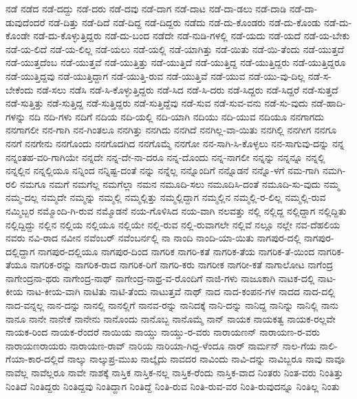 {ನಡೆ
ನಡೆದ
ನಡೆ-ದದ್ದು
ನಡೆ-ದರು
ನಡೆ-ದವು
ನಡೆ-ದಾಗ
ನಡೆ-ದಾಟ
ನಡೆ-ದಾ-ಡಲು
ನಡೆ-ದಾಡಿ
ನಡೆ-ದಾ-ಡುವುದೆಂದರೆ
ನಡೆ-ದಿತ್ತು
ನಡೆ-ದಿದೆ
ನಡೆ-ದಿದ್ದ
ನಡೆ-ದಿದ್ದರು
ನಡೆದು
ನಡೆ-ದು-ಕೊಂಡರು
ನಡೆ-ದು-ಕೊಂಡು
ನಡೆ-ದು-ಕೊಂಡೇ
ನಡೆ-ದು-ಕೊಳ್ಳುತ್ತಿದ್ದರು
ನಡೆ-ದು-ಬಂದ
ನಡೆದೇ
ನಡೆ-ನುಡಿ-ಗಳಲ್ಲಿ
ನಡೆ-ಯದು
ನಡೆ-ಯದೆ
ನಡೆ-ಯ-ಬೇಕು
ನಡೆ-ಯ-ಲಿದೆ
ನಡೆ-ಯ-ಲಿಲ್ಲ
ನಡೆ-ಯಲು
ನಡೆ-ಯಲ್ಲಿ
ನಡೆ-ಯಾಗಿತ್ತು
ನಡೆ-ಯಿತು
ನಡೆ-ಯಿ-ತೆಂದು
ನಡೆ-ಯುತ್ತದೆ
ನಡೆ-ಯುತ್ತದೆಂಬ
ನಡೆ-ಯುತ್ತವೆ
ನಡೆ-ಯುತ್ತಿತ್ತು
ನಡೆ-ಯುತ್ತಿದೆ
ನಡೆ-ಯುತ್ತಿದ್ದ
ನಡೆ-ಯುತ್ತಿದ್ದರು
ನಡೆ-ಯುತ್ತಿದ್ದರೂ
ನಡೆ-ಯುತ್ತಿದ್ದವು
ನಡೆ-ಯುತ್ತಿದ್ದಾಗ
ನಡೆ-ಯುತ್ತಿ-ರುವ
ನಡೆ-ಯುತ್ತಿವೆ
ನಡೆ-ಯುವ
ನಡೆ-ಯು-ವು-ದಿಲ್ಲ
ನಡೆ-ಸ-ಬೇಕೆಂದು
ನಡೆ-ಸಲು
ನಡೆಸಿ
ನಡೆ-ಸಿ-ಕೊಳ್ಳುತ್ತಿದ್ದರು
ನಡೆ-ಸಿದ
ನಡೆ-ಸಿ-ದರು
ನಡೆ-ಸಿದ್ದರು
ನಡೆ-ಸಿದ್ದರೆ
ನಡೆ-ಸುತ್ತದೆ
ನಡೆ-ಸುತ್ತಿತ್ತು
ನಡೆ-ಸುತ್ತಿದ್ದ
ನಡೆ-ಸುತ್ತಿದ್ದರು
ನಡೆ-ಸುತ್ತಿದ್ದೆವು
ನಡೆ-ಸುವ
ನಡೆ-ಸುವ-ವನು
ನಡೆ-ಸು-ವುದು
ನಡೆ-ಹಾದಿ-ಗಳನ್ನು
ನದಿ
ನದಿ-ಗಳು
ನದಿಗೆ
ನದಿಯ
ನದಿ-ಯಲ್ಲಿ
ನದಿ-ಯಾಗಿ
ನದಿಯು
ನದಿ-ಯುವ
ನದಿಯೂ
ನನಗಾಗದು
ನನಗಾಗಲೀ
ನನ-ಗಾಗಿ
ನನ-ಗಿಂತಲೂ
ನನಗಿತ್ತು
ನನಗಿದು
ನನಗಿದೆ
ನನಗಿಲ್ಲ-ವಾ-ಯಿತು
ನನಗಿಲ್ಲಿ
ನನಗೀಗ
ನನಗೂ
ನನಗೆ
ನನಗೇನು
ನನಗೊಂದು
ನನಗೊದಗಿದ
ನನಗೊಮ್ಮೆ
ನನಗೋ
ನನ-ಸಾಗಿ-ಸಿ-ಕೊಳ್ಳಲು
ನನ-ಸಾಗುವು-ದನ್ನು
ನನ್ನ
ನನ್ನಂತಹ-ವರಿ-ಗಾಗಿಯೇ
ನನ್ನದೇ
ನನ್ನ-ದೇ-ನಾ-ದರೂ
ನನ್ನ-ದೊಂದು
ನನ್ನ-ನಾಗಲೀ
ನನ್ನನ್ನು
ನನ್ನನ್ನೂ
ನನ್ನಲ್ಲಿ
ನನ್ನಲ್ಲಿನ
ನನ್ನಲ್ಲಿಯೂ
ನನ್ನಿಂದ
ನನ್ನಿಷ್ಟ-ದಂತೆ
ನನ್ನು
ನನ್ನೆಲ್ಲ
ನನ್ನೊಂದಿಗೆ
ನನ್ನೊಡನೆ
ನನ್ನೊ-ಳಗೆ
ನಮ-ಗಾಗಿ
ನಮಗಿ-ರಲಿ
ನಮಗೂ
ನಮಗೆ
ನಮಗೆಲ್ಲ
ನಮಗೆಲ್ಲಾ
ನಮನ
ನಮೂದಿ-ಸಲು
ನಮೂದಿಸಿ-ದಂತೆ
ನಮೂದಿ-ಸು-ವುದು
ನಮ್ಮ
ನಮ್ಮ-ದಲ್ಲ
ನಮ್ಮದೇ
ನಮ್ಮನ್ನು
ನಮ್ಮಲ್ಲಿ
ನಮ್ಮಲ್ಲಿತ್ತು
ನಮ್ಮಲ್ಲಿದ್ದಾಗ
ನಮ್ಮಲ್ಲಿನ
ನಮ್ಮಲ್ಲಿ-ರ-ಲಿಲ್ಲ
ನಮ್ಮಲ್ಲಿ-ರುವ
ನಮ್ಮಿಬ್ಬರ
ನಮ್ಮೊಂದಿ-ಗಿ-ರುವ
ನಮ್ಮೊಡನೆ
ನಯ-ಗೊಳಿಸಿದ
ನಯ-ವಾಗಿ
ನಲವತ್ತು
ನಲ್ಲಿ
ನಲ್ಲಿದ್ದ
ನಲ್ಲಿದ್ದಾಗ
ನಲ್ಲಿದ್ದಿತು
ನಲ್ಲಿದ್ದಿದ್ದು
ನಲ್ಲಿನ
ನಲ್ಲಿಯ
ನಲ್ಲಿಯೂ
ನಲ್ಲಿಯೇ
ನಲ್ಲಿ-ರುವ
ನಲ್ಲಿ-ರುವಾಗಲೇ
ನಲ್ಲಿವೆ
ನಲ್ಲೂ
ನಲ್ಲೇ
ನವ-ದೆಹಲಿಯ
ನವರು
ನವಿ-ರಾದ
ನವೀನ
ನವೆಂಬರ್
ನವೆಂಬರ್ನಲ್ಲಿ
ನಾ
ನಾಂದಿ
ನಾಂದಿ-ಯಾ-ಯಿತು
ನಾಗಪುರ-ದಲ್ಲಿ
ನಾಗಪುರ-ದಲ್ಲಿದ್ದಾಗ
ನಾಗಪುರ-ದಲ್ಲಿಯೂ
ನಾಗಪುರ-ದಿಂದ
ನಾಗರಿಕ
ನಾಗರಿ-ಕತೆ
ನಾಗರಿಕ-ತೆಯ
ನಾಗರಿಕ-ತೆ-ಯಿಂದ
ನಾಗರಿಕ-ತೆಯೂ
ನಾಗರಿಕ-ರನ್ನು
ನಾಗರಿಕ-ರಾದ
ನಾಗರಿಕ-ರಿಗೆ
ನಾಗರಿ-ಕರು
ನಾಗರೀಕ
ನಾಗರೀ-ಕತೆ
ನಾಗಾಲೋಟ
ನಾಗೆಂದ್ರ
ನಾಗೇಂದ್ರನಾ-ಥರು
ನಾಗೇಂದ್ರ-ನಾಥ್
ನಾಗೇಂದ್ರ-ನಾಥ್ರ-ವ-ರೊಂದಿಗೆ
ನಾಜಿ-ಗಳು
ನಾಜೂಕಾಗಿ
ನಾಟಕ-ದಲ್ಲಿ
ನಾಟ-ಕೀಯ
ನಾಟ-ಕೀಯ-ವಾಗಿ
ನಾಟಿತು
ನಾಟಿ-ತೆಂದು
ನಾಟುತ್ತವೆ
ನಾಥ್
ನಾದ
ನಾದ-ಕಂಪನ-ಗಳ
ನಾದದ
ನಾದ-ದಲ್ಲಿ
ನಾದ-ವನ್ನಲ್ಲ
ನಾನ-ದನ್ನು
ನಾನಲ್ಲಿ
ನಾನಲ್ಲಿಗೆ
ನಾನವ-ರನ್ನು
ನಾನಿದಕ್ಕೆ
ನಾನಿ-ದನ್ನು
ನಾನಿದ್ದ
ನಾನಿನ್ನು
ನಾನಿಲ್ಲಿ
ನಾನು
ನಾನೂ
ನಾನೇ
ನಾನೇಕೆ
ನಾನೇನು
ನಾನೊಂದು
ನಾನೊಬ್ಬ
ನಾನೊಮ್ಮೆ
ನಾನ್
ನಾಯಕ
ನಾಯಕತ್ವ
ನಾಯಕ-ರಲ್ಲವೇ
ನಾಯಕ-ರಿಂದ
ನಾಯಕ-ರೆಂದರೆ
ನಾಯಿಯ
ನಾಯ್ಡು
ನಾಯ್ಡು-ರ-ವರು
ನಾರಾಯಣನ್
ನಾರಾಯಣ-ರ-ವರು
ನಾರಾಯಣರಾಯರು
ನಾರಾಯಣ-ರಾವ್
ನಾರಿಯ
ನಾರಿಯಾ-ಗಿದ್ದ-ಳೆಂದೂ
ನಾರ್
ನಾರ್ಮನ್
ನಾಲ-ಗೆಯ
ನಾಲಿ-ಗೆಯಾ-ಕಾರ-ದಲ್ಲಿದೆ
ನಾಲ್ಕು
ನಾಲ್ಕುಪ್ರ-ಮುಖ
ನಾಲ್ಕೈದು
ನಾವದರ
ನಾವಿಂದು
ನಾವಿ-ದನ್ನು
ನಾವಿಬ್ಬರೂ
ನಾವು
ನಾವೂ
ನಾವೆಲ್ಲ
ನಾವೆಲ್ಲರೂ
ನಾವೇ
ನಾಶಕ್ಕೆ
ನಾಸ್ತಿಕ
ನಾಸ್ತಿಕ-ನಲ್ಲ
ನಾಸ್ತಿಕ-ರೆಂದು
ನಾಸ್ತಿಕ-ವಾದ
ನಿಂತರು
ನಿಂತ-ವರು
ನಿಂತಿತ್ತು
ನಿಂತಿದೆ
ನಿಂತಿದ್ದರು
ನಿಂತಿದ್ದವು
ನಿಂತಿದ್ದಾಗ
ನಿಂತಿದ್ದೆ
ನಿಂತಿ-ರುವ
ನಿಂತಿ-ರುವ-ವರ
ನಿಂತಿ-ರುವುದನ್ನೂ
ನಿಂತಿಲ್ಲ
ನಿಂತು
}

